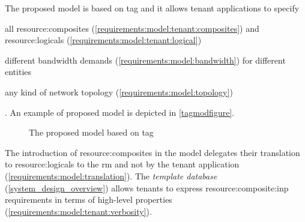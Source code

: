 The proposed model is based on \gls{tag} and it allows tenant applications to specify
\begin{mylist}
    \item all \glspl{resource:composite} (\cmark \ref{requirements:model:tenant:composites}) and \glspl{resource:logical} (\cmark \ref{requirements:model:tenant:logical})
    \item different bandwidth demands (\cmark \ref{requirements:model:bandwidth}) for different entities
    \item any kind of network topology (\cmark \ref{requirements:model:topology})
\end{mylist}.
An example of proposed model is depicted in \autoref{tagmodfigure}.

\begin{figure}[!htb]
    \centering
    \usebox{\tagmodfigure}
    \caption{The proposed model based on \gls{tag}}
    \label{tagmodfigure}
\end{figure}

The introduction of \glspl{resource:composite} in the model delegates their translation to \glspl{resource:logical} to the \gls{rm} and not by the tenant application (\cmark \ref{requirements:model:translation}).
The \textit{template database} (\autoref{system_design_overview}) allows tenants to express \gls{resource:composite:inp} requirements in terms of high-level properties (\cmark \ref{requirements:model:tenant:verbosity}).